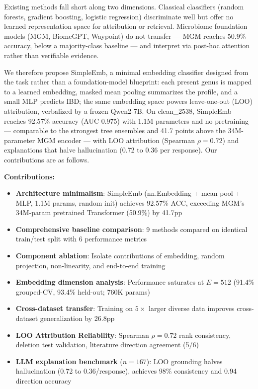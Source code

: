 \documentclass{article} %
\begin{document}
Existing methods fall short along two dimensions. Classical classifiers (random forests, gradient boosting, logistic regression) discriminate well but offer no learned representation space for attribution or retrieval. Microbiome foundation models (MGM, BiomeGPT, Waypoint) do not transfer --- MGM reaches 50.9\% accuracy, below a majority-class baseline --- and interpret via post-hoc attention rather than verifiable evidence.

We therefore propose SimpleEmb, a minimal embedding classifier designed from the task rather than a foundation-model blueprint: each present genus is mapped to a learned embedding, masked mean pooling summarizes the profile, and a small MLP predicts IBD; the same embedding space powers leave-one-out (LOO) attribution, verbalized by a frozen Qwen2-7B. On clean\_2538, SimpleEmb reaches 92.57\% accuracy (AUC 0.975) with 1.1M parameters and no pretraining --- comparable to the strongest tree ensembles and 41.7 points above the 34M-parameter MGM encoder --- with LOO attribution (Spearman $\rho{=}0.72$) and explanations that halve hallucination (0.72 to 0.36 per response). Our contributions are as follows.

\textbf{Contributions:}
\begin{itemize}
  \item \textbf{Architecture minimalism}: SimpleEmb (nn.Embedding + mean pool + MLP, 1.1M params, random init) achieves 92.57\% ACC, exceeding MGM's 34M-param pretrained Transformer (50.9\%) by 41.7pp
  \item \textbf{Comprehensive baseline comparison}: 9 methods compared on identical train/test split with 6 performance metrics
  \item \textbf{Component ablation}: Isolate contributions of embedding, random projection, non-linearity, and end-to-end training
  \item \textbf{Embedding dimension analysis}: Performance saturates at $E{=}512$ (91.4\% grouped-CV, 93.4\% held-out; 760K params)
  \item \textbf{Cross-dataset transfer}: Training on $5\times$ larger diverse data improves cross-dataset generalization by 26.8pp
  \item \textbf{LOO Attribution Reliability}: Spearman $\rho{=}0.72$ rank consistency, deletion test validation, literature direction agreement (5/6)
  \item \textbf{LLM explanation benchmark} ($n{=}167$): LOO grounding halves hallucination (0.72 to 0.36/response), achieves 98\% consistency and 0.94 direction accuracy
\end{itemize}
\end{document}
